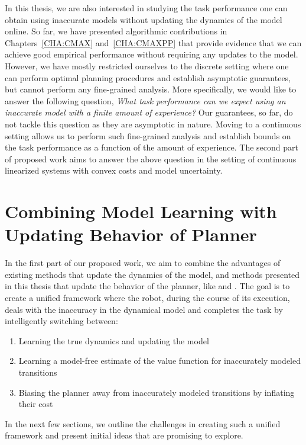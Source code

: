In this thesis, we are also interested in studying the task
performance one can obtain using inaccurate models without
updating the dynamics of the model online. So far, we have presented
algorithmic contributions in Chapters~\ref{CHA:CMAX}
and~\ref{CHA:CMAXPP} that provide evidence that we can achieve
good empirical performance without requiring any updates to the
model. However, we have mostly
restricted ourselves to the discrete setting where one can perform
optimal planning procedures and establish asymptotic guarantees, but
cannot perform any fine-grained analysis. More specifically, we would
like to answer the following question, \textit{What task performance
  can we expect using an inaccurate model with a finite amount of
  experience?} Our guarantees, so far, do not tackle this
question as they are asymptotic in nature. Moving to a continuous
setting allows us to perform such fine-grained analysis and establish
bounds on the task performance as a function of the amount of
experience. The second part of proposed work aims to answer the above
question in the setting of continuous linearized systems with convex
costs and model uncertainty.

\section{Combining Model Learning with Updating Behavior of Planner}
\label{sec:updat-dynam-model}

In the first part of our proposed work, we aim to combine the advantages of
existing methods that update the dynamics of the model, and methods
presented in this thesis that update the behavior of the planner, like
\cmax{} and \cmaxpp{}. The goal is to create a unified framework where
the robot, during the course of its execution, deals with the
inaccuracy in the dynamical model and completes the task by
intelligently switching between: 
\begin{enumerate}
\item Learning the true dynamics and updating the model
\item Learning a model-free estimate of the value function for
  inaccurately modeled transitions
\item Biasing the planner away from inaccurately modeled transitions
  by inflating their cost
\end{enumerate}

In the next few sections, we outline the challenges in creating such a
unified framework and present initial ideas that are promising to
explore.

